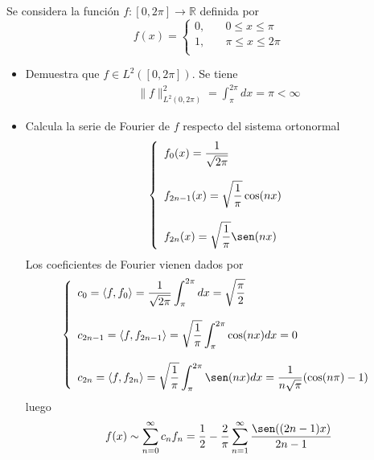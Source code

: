 \documentclass[12pt]{book}
\begin{document}
    \begin{ejemplo}
        Se considera la función $f: [0, 2 \pi] \to \mathbb{R}$ definida por
        $$f(x) = \begin{cases}
            0, \quad& 0 \leq x \leq \pi \\
            1, \quad& \pi \leq x \leq 2\pi \\
        \end{cases}$$
        \begin{itemize}
            \item Demuestra que $f \in L^2([0,2\pi])$. Se tiene  
            \begin{gather*}
                \|f\|^2_{L^2(0,2\pi)} = \int_{\pi}^{2\pi} dx = \pi < \infty
            \end{gather*}

            \item Calcula la serie de Fourier de $f$ respecto del sistema ortonormal
            \begin{gather*}
                \left\{
                \begin{array}{l}
                    \displaystyle f_0(x) = \frac{1}{\sqrt{2 \pi}}\\\\
                    \displaystyle f_{2n-1}(x) = \sqrt{\frac{1}{\pi}} \cos(nx)\\\\
                    \displaystyle f_{2n}(x) = \sqrt{\frac{1}{\pi}} \sen(nx)
                \end{array}
                \right.
            \end{gather*}
            Los coeficientes de Fourier vienen dados por 
            \begin{gather*}
                \left\{
                \begin{array}{l}
                    \displaystyle c_0 = \langle f, f_0 \rangle = \frac{1}{\sqrt{2 \pi}}\int_{\pi}^{2\pi} dx = \sqrt{\frac{\pi}{2}}\\\\
                    \displaystyle c_{2n-1} = \langle f, f_{2n-1} \rangle = \sqrt{\frac{1}{\pi}} \int_{\pi}^{2\pi} \cos(nx) dx = 0\\\\
                    \displaystyle c_{2n} = \langle f, f_{2n} \rangle = \sqrt{\frac{1}{\pi}} \int_{\pi}^{2\pi} \sen(nx) dx = \frac{1}{n\sqrt{\pi}} (\cos(n\pi) - 1)
                \end{array}
                \right.
            \end{gather*}
            luego
            \begin{gather*}
                f(x) \sim \sum_{n=0}^{\infty} c_n f_n = \frac{1}{2} - \frac{2}{\pi} \sum_{n=1}^{\infty} \frac{\sen((2n-1)x)}{2n-1}
            \end{gather*}

        \end{itemize}
    \end{ejemplo}
    
\end{document}
